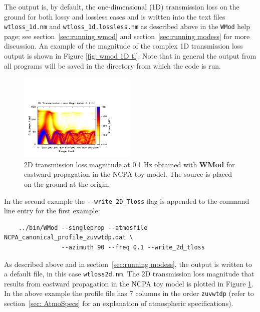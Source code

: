 The output is, by default, the one-dimensional (1D) transmission loss on the ground for both lossy and lossless cases and is written into the text files \verb+wtloss_1d.nm+ and \verb+wtloss_1d.lossless.nm+ as described above in the \verb+WMod+ help page; see section~\ref{sec:running wmod} and section~\ref{sec:running modess} for more discussion.  An example of the magnitude of the complex 1D transmission loss output is shown in Figure \ref{fig: wmod 1D tl}. Note that in general the output from all programs will be saved in the directory from which the code is run.  

\begin{figure}
\begin{center}
\includegraphics[width=0.5\textwidth]{figs/wmod_ex2}
\end{center}
\caption{2D transmission loss magnitude at 0.1 Hz obtained with {\bf WMod} for eastward propagation in the NCPA toy model. The source is placed on the ground at the origin.}
\label{fig: wmod 2D tl}
\end{figure}

\newpage

In the second example the \verb+--write_2D_Tloss+ flag is appended to the command line entry for the first example: 
\begin{verbatim} 
    ../bin/WMod --singleprop --atmosfile NCPA_canonical_profile_zuvwtdp.dat \ 
                --azimuth 90 --freq 0.1 --write_2d_tloss
\end{verbatim}
As described above and in section~\ref{sec:running modess}, the output is written to a default file, in this case \verb+wtloss2d.nm+. The 2D transmission loss magnitude that results from eastward propagation in the NCPA toy model is plotted in Figure \ref{fig: wmod 2D tl}.  In the above example the profile file has 7 columns in the order \verb"zuvwtdp" (refer to section~\ref{sec: AtmoSpecs}  for an explanation of atmospheric specifications).


